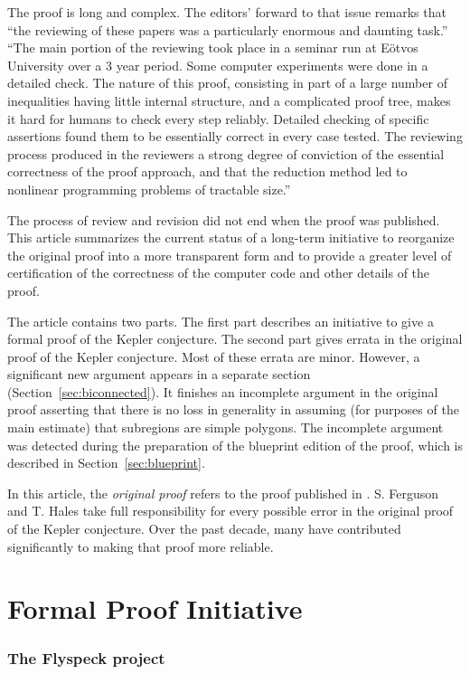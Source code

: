 \documentclass[11pt]{amsart}
\begin{document}
The proof is long and complex.  The editors' forward to that issue remarks
that ``the reviewing of these papers was a particularly enormous and daunting task.''
``The main portion of the reviewing took place in a seminar run at E\"otvos University
over a 3 year period.  Some computer experiments were done in a detailed check.
The nature of this proof, consisting in part of a large number of inequalities having
little internal structure, and a complicated proof tree, makes it hard for humans
to check every step reliably.  Detailed checking of specific assertions found them to
be essentially correct in every case tested.  The reviewing process produced in the
reviewers a strong degree of conviction of the essential correctness of the proof
approach, and that the reduction method led to nonlinear programming problems of
tractable size.''

The process of review and revision did not end when the proof was published.
This article summarizes the current status of a long-term initiative to
reorganize the original proof into a more transparent form and to provide a greater
level of certification of the correctness of the computer code and other details of the proof.  

The article contains two parts.  The first part describes
an initiative to give a formal proof of the Kepler conjecture.  The second part gives errata in the original proof of the Kepler conjecture.  Most of these errata are minor.  However, a significant new argument appears in a separate section (Section~\ref{sec:biconnected}).  It finishes an incomplete argument in the original proof asserting that there is no loss in generality in assuming (for purposes of the main estimate) that subregions are simple polygons.  The incomplete argument was detected during the preparation of the blueprint edition of the proof, which is described in Section~\ref{sec:blueprint}.

In this article, the {\it original proof} refers to the proof published
in \cite{Hales:2006:DCG}.
S. Ferguson and T. Hales take full responsibility for every possible error in the original proof of the Kepler conjecture.  Over the past decade, many have contributed significantly to making that proof more reliable. 


\part{Formal Proof Initiative}

\section{The Flyspeck project}
\end{document}
